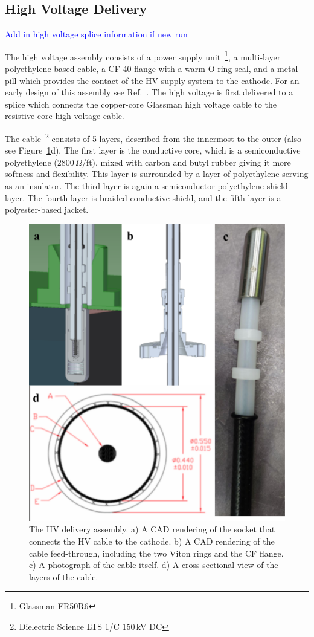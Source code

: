 \documentclass[a4paper,12pt]{article}
\newcommand{\RI}[1]{\textcolor{blue}{#1}}
\begin{document}
\subsection{High Voltage Delivery}
\label{sec:HVdel}
\RI{Add in high voltage splice information if new run}

The high voltage assembly consists of a power supply unit~\footnote{Glassman FR50R6}, a multi-layer polyethylene-based cable, a CF-40 flange with a warm O-ring seal, and a metal pill which provides the contact of the HV supply system to the cathode. For an early design of this assembly see Ref.~\cite{Rebel:2014uia}. The high voltage is first delivered to a splice which connects the copper-core Glassman high voltage cable to the resistive-core high voltage cable. 

The cable~\footnote{Dielectric Science LTS 1/C 150\,kV DC} consists of 5 layers, described from the innermost to the outer (also see Figure~\ref{fig:HV}d). The first layer is the conductive core, which is a semiconductive polyethylene ($2800\,\Omega$/ft), mixed with carbon and butyl rubber giving it more softness and flexibility.  This layer is surrounded by a layer of polyethylene serving as an insulator.  The third layer is again a semiconductor polyethylene shield layer.  The fourth layer is braided conductive shield, and the fifth layer is a polyester-based jacket. 

\begin{figure}[htb]
\centerline{\includegraphics[width=0.65\linewidth]{HV_images.png}}

\caption{The HV delivery assembly. a) A CAD rendering of the socket that connects the HV cable to the cathode. b) A CAD rendering of the cable feed-through, including the two Viton rings and the CF flange. c) A photograph of the cable itself. d) A cross-sectional view of the layers of the cable.}
\label{fig:HV}
\end{figure}
\end{document}
